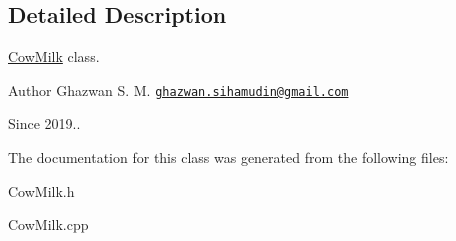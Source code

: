 \subsection{Detailed Description}
\hyperlink{classCowMilk}{Cow\+Milk} class.

\begin{DoxyAuthor}{Author}
Ghazwan S. M. \href{mailto:ghazwan.sihamudin@gmail.com}{\tt ghazwan.\+sihamudin@gmail.\+com} 
\end{DoxyAuthor}
\begin{DoxySince}{Since}
2019.. 
\end{DoxySince}


The documentation for this class was generated from the following files\+:\begin{DoxyCompactItemize}
\item 
Cow\+Milk.\+h\item 
Cow\+Milk.\+cpp\end{DoxyCompactItemize}
